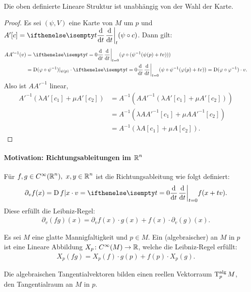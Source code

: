 \begin{lemma}
  Die oben definierte Lineare Struktur ist unabhängig von der Wahl der Karte.
\end{lemma}

\begin{proof}
  Es sei $(\psi, V)$ eine Karte von $M$ um $p$ und $A'[c] = \difffrac[t]{}{t}(\psi \circ c)$. Dann gilt:
  \begin{align*}
    A A'^{-1}(v) & = \difffrac[t=0]{}{t}(\varphi \circ (\psi^{-1} (\psi(p) + tv)))\\
    & = \D(\varphi \circ \psi^{-1})|_{\psi(p)} \cdot \difffrac[t=0]{}{t}(\psi \circ \psi^{-1}(\varphi(p) + tv)) = \D (\varphi \circ \varphi^{-1}) \cdot v.
  \end{align*}
  Also ist $A A'^{-1}$ linear,
  \begin{align*}
    A'^{-1}(\lambda A'[c_1] + \mu A'[c_2]) & = A^{-1}(A A'^{-1}(\lambda A'[c_1] + \mu A'[c_2]))\\
    & = A^{-1} (\lambda A A'^{-1}[c_1] + \mu A A'^{-1} [c_2])\\
    & = A^{-1}(\lambda A [c_1] + \mu A [c_2]).
  \end{align*}
\end{proof}



\paragraph{Motivation: Richtungsableitungen im $\operatorname{\mathbb{R}}^n$}\hfill
\begin{bem}
  
  Für $f,g \in C^{\infty}(\operatorname{\mathbb{R}}^n), \ x,y \in \operatorname{\mathbb{R}}^n$ ist die Richtungsableitung wie folgt definiert:
  \begin{align*}
    \partial_vf(x) = \D f|x \cdot v = \difffrac[t=0]{}{t}f(x+tv).
  \end{align*}
  Diese erfüllt die Leibniz-Regel:
  \begin{align*}
    \partial_v(fg)(x) = \partial_vf(x)\cdot g(x) + f(x) \cdot \partial_v(g)(x).
  \end{align*}
\end{bem}

\begin{dfn}
  Es sei $M$ eine glatte Mannigfaltigkeit und $p\in M$. Ein (algebraischer)  an $M$ in $p$ ist eine Lineare Abbildung $X_p \colon C^{\infty}(M) \to \operatorname{\mathbb{R}}$, welche die Leibniz-Regel erfüllt:
  \begin{align*}
    X_p(fg) = X_p(f) \cdot g(p) + f(p) \cdot X_p(g).
  \end{align*}

  Die algebraischen Tangentialvektoren bilden einen reellen Vektorraum $\operatorname{T}_p^{\text{alg}}M$, den Tangentialraum an $M$ in $p$.
\end{dfn}

